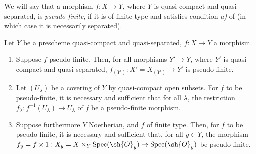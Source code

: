 We will say that a morphism $f:X\to Y$, where $Y$ is quasi-compact and quasi-separated, is \emph{pseudo-finite}, if it is of finite type and satisfies condition \emph{a)} of  (in which case it is necessarily separated).

\begin{corollary}[8.12.4]
\label{IV.8.12.4}
Let $Y$ be a prescheme quasi-compact and quasi-separated, $f:X\to Y$ a morphism.
\begin{enumerate}[label=(\roman*)]
  \item Suppose $f$ pseudo-finite.
Then, for all morphisms $Y'\to Y$, where $Y'$ is quasi-compact and quasi-separated, $f_{(Y')}:X'=X_{(Y')}\to Y'$ is pseudo-finite.
  \item Let $(U_\lambda)$ be a covering of $Y$ by quasi-compact open subsets.
For $f$ to be pseudo-finite, it is necessary and sufficient that for all $\lambda$, the restriction $f_\lambda:f^{-1}(U_\lambda)\to U_\lambda$ of $f$ be a pseudo-finite morphism.
  \item Suppose furthermore $Y$ Noetherian, and $f$ of finite type.
Then, for $f$ to be pseudo-finite, it is necessary and sufficient that, for all $y\in Y$, the morphism $f_y=f\times 1:X_y=X\times_Y\operatorname{Spec}(\sh{O}_y)\to\operatorname{Spec}(\sh{O}_y)$ be pseudo-finite.
\end{enumerate}
\end{corollary}

